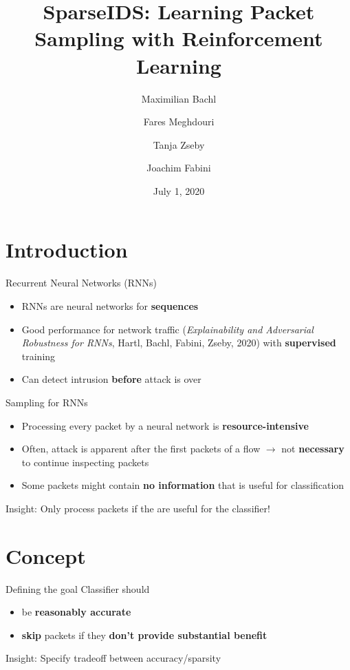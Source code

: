 \documentclass[xcolor={dvipsnames}]{beamer}
\title{SparseIDS: Learning Packet Sampling with Reinforcement Learning}
\author[Maximilian Bachl]{%
	Maximilian Bachl\email{maximilian.bachl@tuwien.ac.at} \and Fares Meghdouri\email{fares.meghdouri@tuwien.ac.at} \and Tanja Zseby\email{tanja.zseby@tuwien.ac.at} \and Joachim Fabini\email{joachim.fabini@tuwien.ac.at}
}
\institute{%
	Technische Universität Wien, Vienna, Austria
}
\date[July 1, 2020]{July 1, 2020}
\begin{document}
\maketitle

\section{Introduction}

\begin{frame}{Recurrent Neural Networks (RNNs)}
\begin{itemize}
\item RNNs are neural networks for \textbf{sequences}
\item Good performance for network traffic (\textit{Explainability and Adversarial Robustness for RNNs}, Hartl, Bachl, Fabini, Zseby, 2020) with \textbf{supervised} training
\item Can detect intrusion \textbf{before} attack is over
\end{itemize}
\end{frame}

\begin{frame}{Sampling for RNNs}
\begin{itemize}
\item Processing every packet by a neural network is \textbf{resource-intensive}
\item Often, attack is apparent after the first packets of a flow $\rightarrow$ not \textbf{necessary} to continue inspecting packets
\item Some packets might contain \textbf{no information} that is useful for classification
\end{itemize}
\pause
\begin{block}{Insight:}
Only process packets if the are useful for the classifier! 
\end{block}
\end{frame}

\section{Concept}

\begin{frame}{Defining the goal}
Classifier should
\begin{itemize}
\item be \textbf{reasonably accurate}
\item \textbf{skip} packets if they \textbf{don't provide substantial benefit}
\end{itemize}
\pause
\begin{block}{Insight:}
Specify tradeoff between accuracy/sparsity 
\end{block}
\end{frame}
\end{document}
